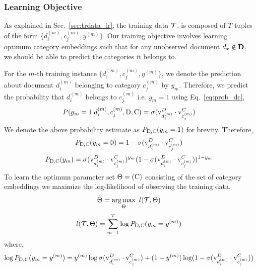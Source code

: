 \subsubsection{Learning Objective}
\label{sec:tro_lr}
As explained in Sec.~\ref{sec:trdata_lr}, the training data $\mathcal{T}$, is composed of $T$ tuples of the form $\{ d^{(m)}_{i}, c^{(m)}_{j}, y^{(m)}\}$. Our training objective involves learning optimum category embeddings such that for any unobserved document $d_{x} \notin \mathbf{D}$, we should be able to predict the categories it belongs to.

For the $m$-th training instance $\{ d^{(m)}_{i}, c^{(m)}_{j}, y^{(m)}\}$, we denote the prediction about document $d^{(m)}_{i}$ belonging to category $c^{(m)}_{j}$ by $y_{m}$. Therefore, we predict the probability that $d^{(m)}_{i}$ belongs to $c^{(m)}_{j}$ i.e. $y_{m} = 1$ using Eq.~\ref{eq:prob_dc},
\begin{equation}
\label{eq:prob_trm}
P(y_{m}=1|d^{(m)}_{i}, c^{(m)}_{j}, \mathrm{D}, \mathrm{C}) = \sigma(\mathrm{v}^{D}_{d^{(m)}_{i}}\cdot \mathrm{v}^{C}_{c^{(m)}_{j}})
\end{equation}
We denote the above probability estimate as $P_{\mathrm{D}, \mathrm{C}}(y_{m} = 1)$ for brevity. Therefore,
\begin{equation}
\label{eq:prob_trm_neg}
P_{\mathrm{D}, \mathrm{C}}(y_{m} = 0) = 1 - \sigma(\mathrm{v}^{D}_{d^{(m)}_{i}}\cdot \mathrm{v}^{C}_{c^{(m)}_{j}})
\end{equation}
\begin{equation}
\label{eq:prob_bernouli}
P_{\mathrm{D}, \mathrm{C}}(y_{m}) = \sigma(\mathrm{v}^{D}_{d^{(m)}_{i}}\cdot \mathrm{v}^{C}_{c^{(m)}_{j}})^{y_{m}}(1 - \sigma(\mathrm{v}^{D}_{d^{(m)}_{i}}\cdot \mathrm{v}^{C}_{c^{(m)}_{j}}))^{1-y_{m}}
\end{equation}
To learn the optimum parameter set $\Theta = (\mathrm{C})$ consisting of the set of category embeddings we maximize the log-likelihood of observing the training data,
\begin{equation}
\label{eq:cembed_argmax}
\hat{\Theta} =  \operatorname*{arg\,max}_{\Theta}~l(\mathcal{T}, \Theta)
\end{equation}
\begin{equation}
\label{eq:new_to_lr}
l(\mathcal{T}, \Theta) = \sum_{m=1}^{T} \log P_{\mathrm{D}, \mathrm{C}}(y_{m} = y^{(m)})
\end{equation}
where,
\begin{equation}
\label{eq:log_P_lr}
\log P_{\mathrm{D}, \mathrm{C}}(y_{m} = y^{(m)}) = y^{(m)}\log \sigma(\mathrm{v}^{D}_{d^{(m)}_{i}}\cdot \mathrm{v}^{C}_{c^{(m)}_{j}}) + (1 - y^{(m)})\log (1 - \sigma(\mathrm{v}^{D}_{d^{(m)}_{i}}\cdot \mathrm{v}^{C}_{c^{(m)}_{j}}))
\end{equation}

